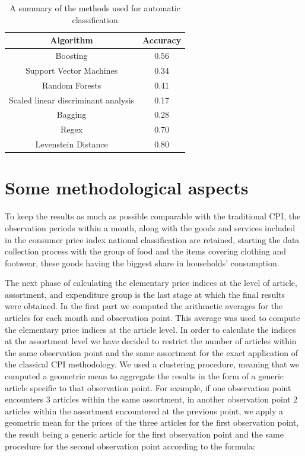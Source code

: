 \documentclass[]{article}
\begin{document}
\begin{table}[h!]
	\centering
	\begin{tabular}{| c| c| }
		\hline
		Algorithm & Accuracy \\
		\hline  
		Boosting & 0.56 \\  
		Support Vector Machines & 0.34 \\
		Random Forests &  0.41 \\
		Scaled linear discriminant analysis & 0.17 \\
		Bagging & 0.28 \\
		Regex & 0.70 \\
		Levenstein Distance & 0.80 \\
		\hline
	\end{tabular}
\caption{A summary of the methods used for automatic classification}
\label{table:1}
\end{table}

\section{Some methodological aspects}
To keep the results as much as possible comparable with the traditional CPI, the observation periods within a month, 
along with the goods and services included in the consumer price index national classification are retained, starting 
the data collection process with the group of food and the items covering clothing and footwear, these goods 
having the biggest share in households’ consumption. 


The next phase of calculating the elementary price indices at the level of article, assortment, and expenditure group 
is the last stage at which the final results were obtained. In the first part we computed the arithmetic 
averages for the articles for each month and observation point. This average was used to compute the elementary 
price indices at the article level. In order to calculate the indices at the assortment level we have decided to 
restrict the number of articles within the same observation point and the same assortment for the exact application 
of the classical CPI methodology. We used a clustering procedure, meaning that we computed a geometric mean to 
aggregate the results in the form of a generic article specific to that observation point. For example, if one 
observation point encounters 3 articles within the same assortment, in another observation point 2 articles 
within the assortment encountered at the previous point, we apply a geometric mean for the prices of the three 
articles for the first observation point, the result being a generic article for the first observation point and the 
same procedure for the second observation point according to the formula:
\end{document}
